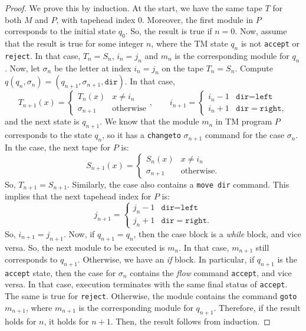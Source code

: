 \documentclass{amsart}
\theoremstyle{definition}
\begin{document}
    \begin{proof}
        We prove this by induction. At the start, we have the same tape $T$ for both $M$ and $P$, with tapehead index $0$. Moreover, the first module in $P$ corresponds to the initial state $q_0$. So, the result is true if $n = 0$. Now, assume that the result is true for some integer $n$, where the TM state $q_n$ is not \texttt{accept} or \texttt{reject}. In that case, $T_n = S_n$, $i_n = j_n$ and $m_n$ is the corresponding module for $q_n$. Now, let $\sigma_n$ be the letter at index $i_n = j_n$ on the tape $T_n = S_n$. Compute $q(q_n, \sigma_n) = (q_{n+1}, \sigma_{n+1}, \texttt{dir})$. In that case,
        \[T_{n+1}(x) = \begin{cases}
            T_n(x) & x \neq i_n \\
            \sigma_{n+1} & \text{otherwise}
        \end{cases}, \qquad i_{n+1} = \begin{cases}
            i_n - 1 & \texttt{dir} = \texttt{left} \\
            i_n + 1 & \texttt{dir} = \texttt{right},
        \end{cases}\]
        and the next state is $q_{n+1}$. We know that the module $m_n$ in TM program $P$ corresponds to the state $q_n$, so it has a \texttt{changeto} $\sigma_{n+1}$ command for the case $\sigma_n$. In the case, the next tape for $P$ is:
        \[S_{n+1}(x) = \begin{cases}
            S_n(x) & x \neq i_n \\
            \sigma_{n+1} & \text{otherwise}.
        \end{cases}\]
        So, $T_{n+1} = S_{n+1}$. Similarly, the case also contains a \texttt{move dir} command. This implies that the next tapehead index for $P$ is:
        \[j_{n+1} = \begin{cases}
            j_n - 1 & \texttt{dir} = \texttt{left} \\
            j_n + 1 & \texttt{dir} = \texttt{right}.
        \end{cases}\]
        So, $i_{n+1} = j_{n+1}$. Now, if $q_{n+1} = q_n$, then the case block is a \textit{while} block, and vice versa. So, the next module to be executed is $m_n$. In that case, $m_{n+1}$ still corresponds to $q_{n+1}$. Otherwise, we have an \textit{if} block. In particular, if $q_{n+1}$ is the \texttt{accept} state, then the case for $\sigma_n$ contains the \textit{flow} command \texttt{accept}, and vice versa. In that case, execution terminates with the same final status of \texttt{accept}. The same is true for \texttt{reject}. Otherwise, the module contains the command \texttt{goto} $m_{n+1}$, where $m_{n+1}$ is the corresponding module for $q_{n+1}$. Therefore, if the result holds for $n$, it holds for $n+1$. Then, the result follows from induction.
    \end{proof}
\end{document}
